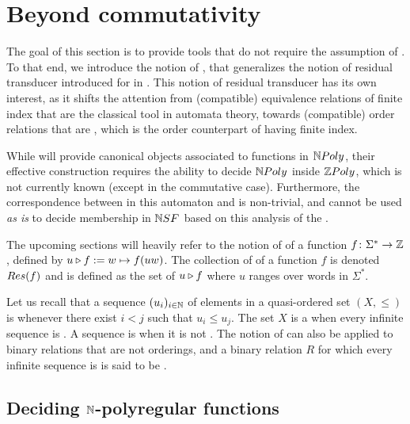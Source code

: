 \section{Beyond commutativity}
\label{beyond-commutative:sec}

The goal of this section is to provide tools that do not require the assumption
of . To that end, we introduce the notion of , that generalizes the notion of residual transducer introduced for
 in \cite{LOPEZ23b}. This notion of residual
transducer has its own interest, as it shifts the attention from (compatible)
equivalence relations of finite index that are the classical tool in automata
theory, towards (compatible) order relations that are ,
which is the order counterpart of having finite index.

While  will provide canonical objects associated
to functions in $\NPoly$, their effective construction requires the ability to
decide $\NPoly$ inside $\ZPoly$, which is not currently known (except in the
commutative case). Furthermore, the correspondence between  in
this automaton and  is non-trivial,
and cannot be used \emph{as is} to decide membership in $\NSF$
based on this analysis of the .

\AP The upcoming sections will heavily refer to the notion of  of
a function $f \colon \Sigma^* \to \Rel$,  defined by $\app{f}{u} \defined w
\mapsto f(uw)$. The collection of  of a function $f$ is
denoted $\Res(f)$ and is defined as the set of $\app{f}{u}$ where $u$ ranges
over words in $\Sigma^*$.

\AP Let us recall that a sequence $\seqof{u_i}{i \in \Nat}$ of elements in a
quasi-ordered set $(X, \leq)$ is  whenever there exist $i < j$ such
that $u_i \leq u_j$. The set $X$ is a  when every
infinite sequence is . A sequence is  when it is not
. The notion of  can also be applied to
binary relations that are not orderings, and a binary relation $R$ for which
every infinite sequence is  is said to be 
\cite{MELL98}.

\subsection{Deciding $\Nat$-polyregular functions}


